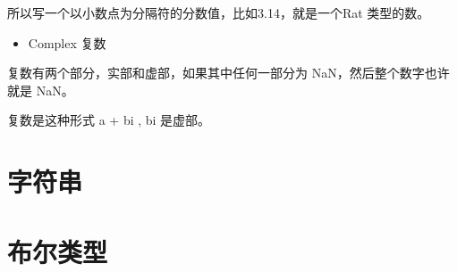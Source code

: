 \documentclass{ctexart}
\begin{document}
所以写一个以小数点为分隔符的分数值，比如3.14，就是一个Rat 类型的数。

\begin{itemize}
\item Complex 复数
\end{itemize}
复数有两个部分，实部和虚部，如果其中任何一部分为 NaN，然后整个数字也许就是 NaN。

复数是这种形式 a + bi , bi 是虚部。
\section{字符串}
\label{sec-4}
\section{布尔类型}
\label{sec-5}
\end{document}
